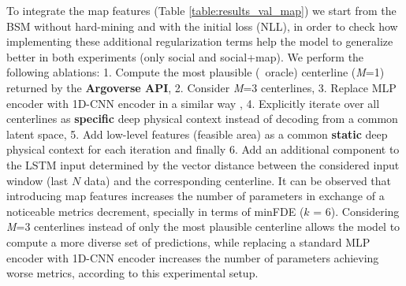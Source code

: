 To integrate the map features (Table \ref{table:results_val_map}) we start from the BSM without hard-mining and with the initial loss (NLL), in order to check how implementing these additional regularization terms help the model to generalize better in both experiments (only social and social+map). We perform the following ablations: 1. Compute the most plausible (\aka \ oracle) centerline (\textit{M}=1) returned by the \textbf{Argoverse API}, 2. Consider \textit{M}=3 centerlines, 3. Replace MLP encoder with 1D-CNN encoder in a similar way \cite{mercat2020multi}, 4. Explicitly iterate over all centerlines as \textbf{specific} deep physical context instead of decoding from a common latent space, 5. Add low-level features (feasible area) as a common \textbf{static} deep physical context for each iteration and finally 6. Add an additional component to the LSTM input determined by the vector distance between the considered input window (last $N$ data) and the corresponding centerline. It can be observed that introducing map features increases the number of parameters in exchange of a noticeable metrics decrement, specially in terms of minFDE ($k$ = 6). Considering \textit{M}=3 centerlines instead of only the most plausible centerline allows the model to compute a more diverse set of predictions, while replacing a standard MLP encoder with 1D-CNN encoder increases the number of parameters achieving worse metrics, according to this experimental setup. 

